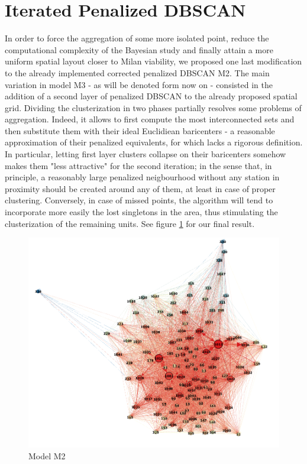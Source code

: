 \documentclass[11pt,twoside]{report}
\begin{document}
\section{Iterated Penalized DBSCAN}
In order to force the aggregation of some more isolated point, reduce the computational complexity of the Bayesian study and finally attain a more uniform spatial layout closer to Milan viability, we proposed one last modification to the already implemented corrected penalized DBSCAN M2. The main variation in model M3 - as will be denoted form now on - consisted in the addition of a second layer of penalized DBSCAN to the already proposed spatial grid. Dividing the clusterization in two phases partially resolves some problems of aggregation. Indeed, it allows to first compute the most interconnected sets and then substitute them with their ideal Euclidiean baricenters - a reasonable approximation of their penalized equivalents, for which lacks a rigorous definition. In particular, letting first layer clusters collapse on their baricenters somehow makes them "less attractive" for the second iteration; in the sense that, in principle, a reasonably large penalized neigbourhood without any station in proximity should be created around any of them, at least in case of proper clustering. Conversely, in case of missed points, the algorithm will tend to incorporate more easily the lost singletons in the area, thus stimulating the clusterization of the remaining units. See figure \ref{fig:comparison} for our final result.
\begin{figure}[H]
		\centering
		\includegraphics[width=100 mm]{pictures/M2_graph.png}
		\caption{Model M2}
	\label{fig:comparison}
\end{figure}
\end{document}
